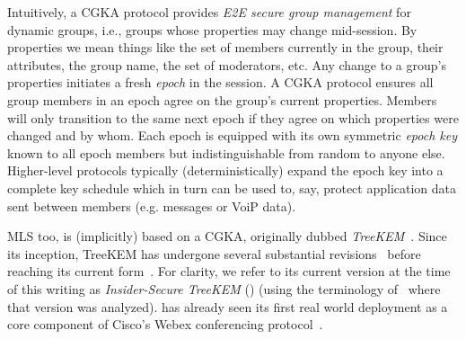 Intuitively, a CGKA protocol provides \emph{E2E secure group management} for
dynamic groups, i.e., groups whose properties may change mid-session. By
properties we mean things like the set of members currently in the group,
their attributes, the group name, the set of moderators, etc. Any change to a
group's properties initiates a fresh \emph{epoch} in the session. A CGKA
protocol ensures all group members in an epoch agree on the group's current
properties. Members will only transition to the same next epoch if they agree
on which properties were changed and by whom. Each epoch is equipped with its
own symmetric \emph{epoch key} known to all epoch members but
indistinguishable from random to anyone else. Higher-level protocols
typically (deterministically) expand the epoch key into a complete key
schedule which in turn can be used to, say, protect application data sent
between members (e.g. messages or VoiP data).

MLS too, is (implicitly) based on a CGKA, originally dubbed
\emph{TreeKEM}~\cite{TreeKEM}. Since its inception, TreeKEM has undergone several
substantial
revisions~\cite{TreeKEM-with-blanking-email,TreeKEM-prop-and-comm-email}
before reaching its current
form~\cite{mls-protocol-latest,EPRINT:AlwJosMul20}. For clarity, we refer to
its current version at the time of this writing as \emph{Insider-Secure
TreeKEM} (\protITK) (using the terminology of~\cite{EPRINT:AlwJosMul20} where
that version was analyzed). \protITK has already seen its first real world
deployment as a core component of Cisco's Webex conferencing
protocol~\cite{Cisco-Webex-MLS}.

